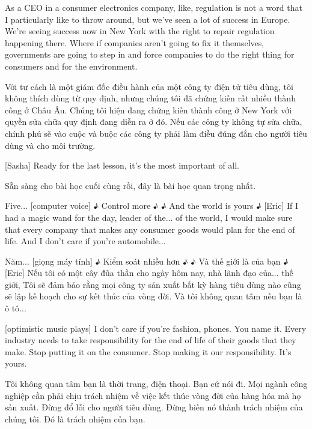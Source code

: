 \documentclass[a4paper]{article}
\begin{document}
	As a CEO in a consumer electronics company, like, regulation is not a word that I particularly like to throw around, but we've seen a lot of success in Europe.
	We're seeing success now in New York with the right to repair regulation happening there.
	Where if companies aren't going to fix it themselves, governments are going to step in and force companies to do the right thing for consumers and for the environment.
	
	\begin{vietnamese-v2}
		Với tư cách là một giám đốc điều hành của một công ty điện tử tiêu dùng, tôi không thích dùng từ quy định, nhưng chúng tôi đã chứng kiến rất nhiều thành công ở Châu Âu.
		Chúng tôi hiện đang chứng kiến thành công ở New York với quyền sửa chữa quy định đang diễn ra ở đó.
		Nếu các công ty không tự sửa chữa, chính phủ sẽ vào cuộc và buộc các công ty phải làm điều đúng đắn cho người tiêu dùng và cho môi trường.
	\end{vietnamese-v2}
	
	[Sasha] Ready for the last lesson, it's the most important of all.
	
	\begin{vietnamese-v2}
		[Sasha] Sẵn sàng cho bài học cuối cùng rồi, đây là bài học quan trọng nhất.
	\end{vietnamese-v2}
	
	Five...
	[computer voice] ♪ Control more ♪
	♪ And the world is yours ♪
	[Eric] If I had a magic wand for the day,
	leader of the... of the world,
	I would make sure that every company that makes any consumer goods would plan for the end of life.
	And I don't care if you're automobile...
	
	\begin{vietnamese-v2}
		Năm...
		[giọng máy tính] ♪ Kiểm soát nhiều hơn ♪
		♪ Và thế giới là của bạn ♪
		[Eric] Nếu tôi có một cây đũa thần cho ngày hôm nay,
		nhà lãnh đạo của... thế giới,
		Tôi sẽ đảm bảo rằng mọi công ty sản xuất bất kỳ hàng tiêu dùng nào cũng sẽ lập kế hoạch cho sự kết thúc của vòng đời.
		Và tôi không quan tâm nếu bạn là ô tô...
	\end{vietnamese-v2}
	
	[optimistic music plays]
	I don't care if you're fashion, phones.
	You name it.
	Every industry needs to take responsibility for the end of life of their goods that they make.
	Stop putting it on the consumer.
	Stop making it our responsibility.
	It's yours.
	
	\begin{vietnamese-v2}
		Tôi không quan tâm bạn là thời trang, điện thoại.
		Bạn cứ nói đi.
		Mọi ngành công nghiệp cần phải chịu trách nhiệm về việc kết thúc vòng đời của hàng hóa mà họ sản xuất.
		Đừng đổ lỗi cho người tiêu dùng.
		Đừng biến nó thành trách nhiệm của chúng tôi.
		Đó là trách nhiệm của bạn.
	\end{vietnamese-v2}
	
\end{document}

